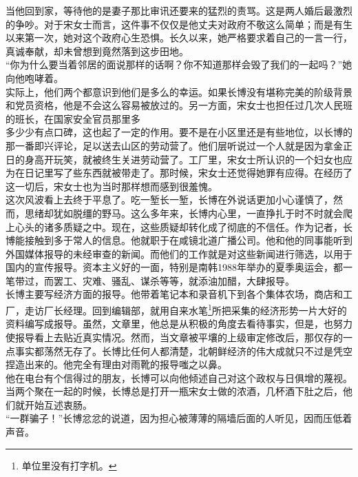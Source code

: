 \begin{multicols}{\theparacolNo}
当他回到家，等待他的是妻子那比审讯还要来的猛烈的责骂。这是两人婚后最激烈的争吵。对于宋女士而言，这件事不仅仅是他丈夫对政府不敬这么简单；而是有生以来第一次，她对这个政府心生恐惧。长久以来，她严格要求着自己的一言一行，真诚奉献，却未曾想到竟然落到这步田地。\\

“你为什么要当着邻居的面说那样的话啊？你不知道那样会毁了我们的一起吗？”她向他咆哮着。\\

实际上，他们两个都意识到他们是多么的幸运。如果长博没有堪称完美的阶级背景和党员资格，他是不会这么容易被放过的。另一方面，宋女士也担任过几次人民班的班长，在国家安全官员那里多\\

多少少有点口碑，这也起了一定的作用。要不是在小区里还是有些地位，以长博的那一番即兴评论，足以送去山区的劳动营了。他们层听说过一个人就是因为拿金正日的身高开玩笑，就被终生关进劳动营了。工厂里，宋女士所认识的一个妇女也应为在日记里写了些东西就被带走了。那时候，宋女士还觉得她罪有应得。在经历了这一切后，宋女士也为当时那样想而感到很羞愧。\\

这次风波看上去终于平息了。吃一堑长一堑，长博在外说话更加小心谨慎了，然而，思绪却犹如脱缰的野马。这么多年来，长博内心里，一直挣扎于时不时就会爬上心头的诸多质疑之中。现在，这些质疑却转化成了彻底的不信任。作为记者，长博能接触到多于常人的信息。他就职于在咸镜北道广播公司。他和他的同事能听到外国媒体报导的未经审查的新闻。而他们的工作就是对这些新闻进行筛选，以用于国内的宣传报导。资本主义好的一面，特别是南韩1988年举办的夏季奥运会，都一笔带过，而罢工、灾难、骚乱、谋杀等等，就添油加醋，大肆报导。\\

长博主要写经济方面的报导。他带着笔记本和录音机下到各个集体农场，商店和工厂，走访厂长经理。回到编辑部，就用自来水笔\footnote{单位里没有打字机。}所把采集的经济形势一片大好的资料编写成报导。虽然，文章里，他总是从积极的角度去看待事实，但是，也努力使报导看上去贴近真实情况。然而，当文章被平壤的上级审定修改后，那仅存的一点事实都荡然无存了。长博比任何人都清楚，北朝鲜经济的伟大成就只不过是凭空捏造出来的。他完全有理由对雨靴的报导嗤之以鼻。\\

他在电台有个信得过的朋友，长博可以向他倾述自己对这个政权与日俱增的蔑视。当两个聚在一起的时候，长博总是打开一瓶宋女士做的浓酒，几杯酒下肚之后，他们就开始互述衷肠。\\

“一群骗子！”长博忿忿的说道，因为担心被薄薄的隔墙后面的人听见，因而压低着声音。\\


\end{multicols}
